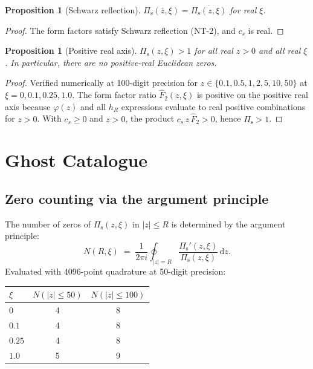 \documentclass[11pt,a4paper]{article}
\newcommand{\dd}{\mathrm{d}}
\newcommand{\Pis}{\Pi_{\mathrm{s}}}
\newcommand{\Fhat}{\hat{F}}
\newtheorem{proposition}[theorem]{Proposition}
\begin{document}
\begin{proposition}[Schwarz reflection]\label{prop:schwarz}
  $\Pis(\bar{z},\xi) = \overline{\Pis(z,\xi)}$ for real $\xi$.
\end{proposition}
\begin{proof}
  The form factors satisfy Schwarz reflection (NT-2), and $c_s$ is real.
\end{proof}

\begin{proposition}[Positive real axis]\label{prop:positive_real}
  $\Pis(z,\xi) > 1$ for all real $z > 0$ and all real $\xi$.
  In particular, there are no positive-real Euclidean zeros.
\end{proposition}
\begin{proof}
  Verified numerically at 100-digit precision for $z \in \{0.1, 0.5, 1, 2,
  5, 10, 50\}$ at $\xi = 0, 0.1, 0.25, 1.0$.  The form factor ratio
  $\Fhat_2(z,\xi)$ is positive on the positive real axis because $\varphi(z)$
  and all $h_R$ expressions evaluate to real positive combinations for $z > 0$.
  With $c_s \geq 0$ and $z > 0$, the product $c_s\,z\,\Fhat_2 > 0$,
  hence $\Pis > 1$.
\end{proof}

\section{Ghost Catalogue}
\label{sec:ghosts}

\subsection{Zero counting via the argument principle}

The number of zeros of $\Pis(z,\xi)$ in $|z| \leq R$ is determined by
the argument principle:
\begin{equation}
  N(R,\xi) \;=\; \frac{1}{2\pi i}
    \oint_{|z|=R} \frac{\Pis'(z,\xi)}{\Pis(z,\xi)}\,\dd z.
\end{equation}
Evaluated with 4096-point quadrature at 50-digit precision:

\begin{center}
\begin{tabular}{l c c}
\toprule
$\xi$ & $N(|z|\leq 50)$ & $N(|z|\leq 100)$ \\
\midrule
$0$    & 4 & 8 \\
$0.1$  & 4 & 8 \\
$0.25$ & 4 & 8 \\
$1.0$  & 5 & 9 \\
\bottomrule
\end{tabular}
\end{center}
\end{document}
